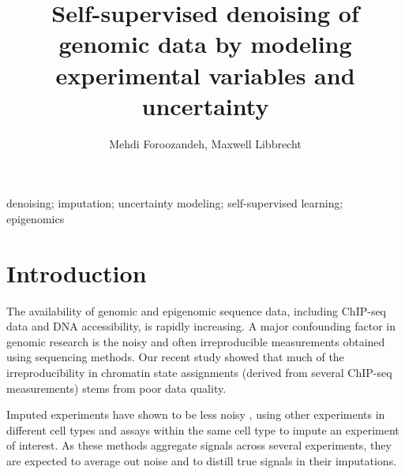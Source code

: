 \documentclass[twoside,11pt]{article}
\begin{document}
\title{Self-supervised denoising of genomic data by modeling experimental variables and uncertainty}

\author{\centering\name Mehdi Foroozandeh, Maxwell Libbrecht\\}

\maketitle

\vspace{-2em}
\begin{abstract}%

\end{abstract}

\begin{keywords}
  denoising; imputation; uncertainty modeling; self-supervised learning; epigenomics
\end{keywords}

\section{Introduction}

The availability of genomic and epigenomic sequence data, including ChIP-seq data and DNA accessibility, is rapidly increasing. A major confounding factor in genomic research is the noisy and often irreproducible measurements obtained using sequencing methods. 
Our recent study \cite{shahraki2024robust} showed that much of the irreproducibility in chromatin state assignments (derived from several ChIP-seq measurements) stems from poor data quality.

Imputed experiments have shown to be less noisy  \cite{ernst2015large}, using other experiments in different cell types and assays within the same cell type to impute an experiment of interest. As these methods aggregate signals across several experiments, they are expected to average out noise and to distill true signals in their imputations. 
\end{document}
